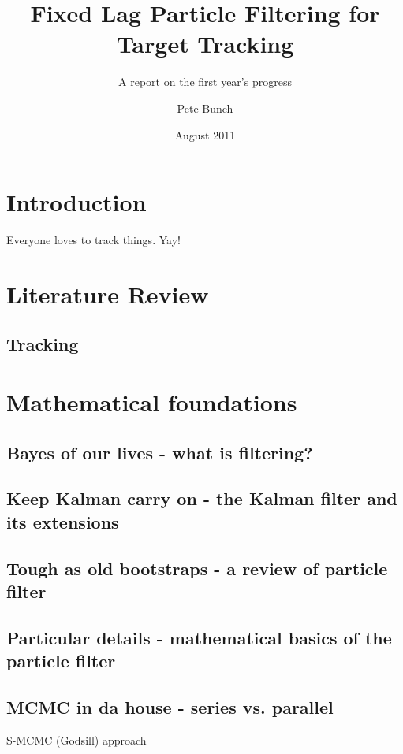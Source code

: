\documentclass{RJWThesis}
\title{Fixed Lag Particle Filtering for Target Tracking}
\subtitle{A report on the first year's progress}
\author{Pete Bunch}
\date{August 2011}
\begin{document}
\maketitle
\tableofcontents


\chapter{Introduction}
Everyone loves to track things. Yay! 




\chapter{Literature Review}

\section{Tracking}





\chapter{Mathematical foundations} \label{chap:basics}
\section{Bayes of our lives - what is filtering?}


\section{Keep Kalman carry on - the Kalman filter and its extensions}


\section{Tough as old bootstraps - a review of particle filter}


\section{Particular details - mathematical basics of the particle filter}


\section{MCMC in da house - series vs. parallel}
S-MCMC (Godsill) approach
\end{document}
